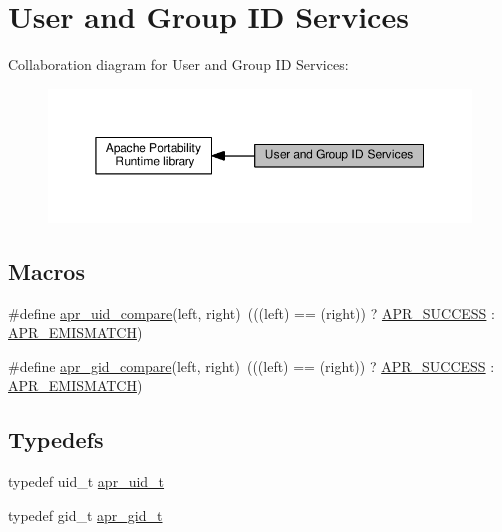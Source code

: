 \hypertarget{group__apr__user}{}\section{User and Group ID Services}
\label{group__apr__user}
Collaboration diagram for User and Group ID Services\+:
\nopagebreak
\begin{figure}[H]
\begin{center}
\leavevmode
\includegraphics[width=350pt]{group__apr__user}
\end{center}
\end{figure}
\subsection*{Macros}
\begin{DoxyCompactItemize}
\item 
\#define \hyperlink{group__apr__user_gafc0e18b67f8e3471848893cc4a052809}{apr\+\_\+uid\+\_\+compare}(left,  right)~(((left) == (right)) ? \hyperlink{group__apr__errno_ga9ee311b7bf1c691dc521d721339ee2a6}{A\+P\+R\+\_\+\+S\+U\+C\+C\+E\+SS} \+: \hyperlink{group__APR__Error_ga31e65a44daba96aa6d943529e94498e7}{A\+P\+R\+\_\+\+E\+M\+I\+S\+M\+A\+T\+CH})
\item 
\#define \hyperlink{group__apr__user_gaa87aee2f533bed9dac33613fcf398713}{apr\+\_\+gid\+\_\+compare}(left,  right)~(((left) == (right)) ? \hyperlink{group__apr__errno_ga9ee311b7bf1c691dc521d721339ee2a6}{A\+P\+R\+\_\+\+S\+U\+C\+C\+E\+SS} \+: \hyperlink{group__APR__Error_ga31e65a44daba96aa6d943529e94498e7}{A\+P\+R\+\_\+\+E\+M\+I\+S\+M\+A\+T\+CH})
\end{DoxyCompactItemize}
\subsection*{Typedefs}
\begin{DoxyCompactItemize}
\item 
typedef uid\+\_\+t \hyperlink{group__apr__user_gad1aa508f584bc230acf4f68ba4fc4de7}{apr\+\_\+uid\+\_\+t}
\item 
typedef gid\+\_\+t \hyperlink{group__apr__user_ga22e9e224e984f837f3e276833e2f3a55}{apr\+\_\+gid\+\_\+t}
\end{DoxyCompactItemize}
